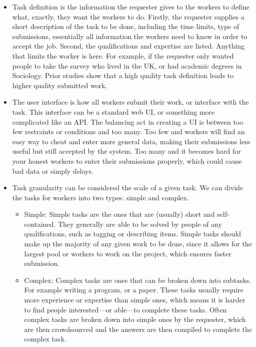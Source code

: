 \documentclass{sig-alternate-05-2015}
\begin{document}
	\begin{itemize}
		\item Task definition is the information the requester gives to the workers to define what, exactly, they want the workers to do. Firstly, the requester supplies a short description of the task to be done, including the time limits, type of submissions, essentially all information the workers need to know in order to accept the job. \cite{chen2011opportunities}
		Second, the qualifications and expertise are listed. Anything that limits the worker is here. For example, if the requester only wanted people to take the survey who lived in the UK, or had academic degrees in Sociology. Prior studies show that a high quality task definition leads to higher quality submitted work. \cite{chen2011opportunities}
		
		\item The user interface is how all workers submit their work, or interface with the task. This interface can be a standard web UI, or something more complicated like an API. The balancing act in creating a UI is between too few restraints or conditions and too many. Too few and workers will find an easy way to cheat and enter more general data, making their submissions less useful but still accepted by the system. \cite{allahbakhsh2013quality} Too many and it becomes hard for your honest workers to enter their submissions properly, which could cause bad data or simply delays.
		
		\item Task granularity can be considered the scale of a given task. We can divide the tasks for workers into two types: simple and complex.
		\begin{itemize}
			\item Simple: Simple tasks are the ones that are (usually) short and self-contained. They generally are able to be solved by people of any qualifications, such as tagging or describing items. \cite{kittur2011crowdforge} Simple tasks should make up the majority of any given work to be done, since it allows for the largest pool or workers to work on the project, which ensures faster submission.
			
			\item Complex: Complex tasks are ones that can be broken down into subtasks. For example writing a program, or a paper. These tasks usually require more experience or expertise than simple ones, which means it is harder to find people interested---or able---to complete these tasks. Often complex tasks are broken down into simple ones by the requester, which are then crowdsourced and the answers are then compiled to complete the complex task.
		\end{itemize}
		

\end{itemize}
\end{document}

